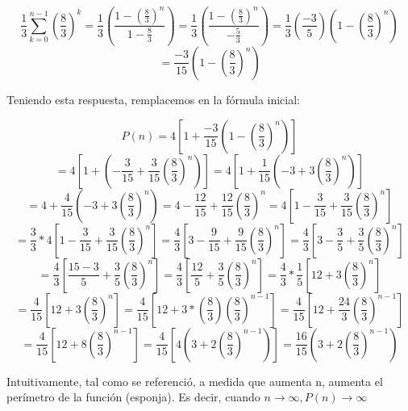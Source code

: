 \documentclass[12pt]{article}
\begin{document}
\begin{equation*}
    \frac{1}{3}\sum_{k=0}^{n-1}\left(\frac{8}{3}\right)^k=\frac{1}{3}\left(\frac{1-\left(\frac{8}{3}\right)^n}{1-\frac{8}{3}}\right)=\frac{1}{3}\left(\frac{1-\left(\frac{8}{3}\right)^n}{-\frac{5}{3}}\right)=\frac{1}{3}\left(\frac{-3}{5}\right)\left(1-\left(\frac{8}{3}\right)^n\right)
\end{equation*}
\begin{equation*}
    =\frac{-3}{15}\left(1-\left(\frac{8}{3}\right)^n\right)
\end{equation*}

Teniendo esta respuesta, remplacemos en la fórmula inicial:

\begin{equation*}
    P(n)=4\left[1+\frac{-3}{15}\left(1-\left(\frac{8}{3}\right)^n\right)\right]
\end{equation*}
\begin{equation*}
    =4\left[1+\left(-\frac{3}{15}+\frac{3}{15}\left(\frac{8}{3}\right)^n\right)\right]=4\left[1+\frac{1}{15}\left(-3+3\left(\frac{8}{3}\right)^n\right)\right]
\end{equation*}
\begin{equation*}
    =4+\frac{4}{15}\left(-3+3\left(\frac{8}{3}\right)^n\right)=4-\frac{12}{15}+\frac{12}{15}\left(\frac{8}{3}\right)^n=4\left[1-\frac{3}{15}+\frac{3}{15}\left(\frac{8}{3}\right)^n\right]
\end{equation*}
\begin{equation*}
    =\frac{3}{3}*4\left[1-\frac{3}{15}+\frac{3}{15}\left(\frac{8}{3}\right)^n\right]=\frac{4}{3}\left[3-\frac{9}{15}+\frac{9}{15}\left(\frac{8}{3}\right)^n\right]=\frac{4}{3}\left[3-\frac{3}{5}+\frac{3}{5}\left(\frac{8}{3}\right)^n\right]
\end{equation*}
\begin{equation*}
    =\frac{4}{3}\left[\frac{15-3}{5}+\frac{3}{5}\left(\frac{8}{3}\right)^n\right]=\frac{4}{3}\left[\frac{12}{5}+\frac{3}{5}\left(\frac{8}{3}\right)^n\right]=\frac{4}{3}*\frac{1}{5}\left[12+3\left(\frac{8}{3}\right)^n\right]
\end{equation*}
\begin{equation*}
    =\frac{4}{15}\left[12+3\left(\frac{8}{3}\right)^n\right]=\frac{4}{15}\left[12+3*\left(\frac{8}{3}\right)\left(\frac{8}{3}\right)^{n-1}\right]=\frac{4}{15}\left[12+\frac{24}{3}\left(\frac{8}{3}\right)^{n-1}\right]
\end{equation*}
\begin{equation*}
    =\frac{4}{15}\left[12+8\left(\frac{8}{3}\right)^{n-1}\right]=\frac{4}{15}\left[4\left(3+2\left(\frac{8}{3}\right)^{n-1}\right)\right]=\frac{16}{15}\left(3+2\left(\frac{8}{3}\right)^{n-1}\right)
\end{equation*}

Intuitivamente, tal como se referenció, a medida que aumenta n, aumenta el perímetro de la función (esponja). Es decir, cuando $n\rightarrow\infty, P(n)\rightarrow\infty$
\end{document}
